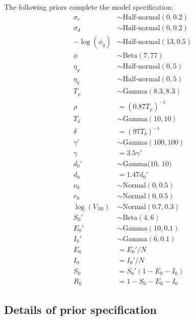 \documentclass[12pt,letterpaper]{article}
\begin{document}
The following priors complete the model specification:
\begin{align}
\sigma_r & \sim \text{Half-normal}(0, 0.2)\\
\sigma_d & \sim \text{Half-normal}(0, 0.2)\\
-\log(\phi_q) & \sim \text{Half-normal}(13, 0.5)\\
\phi & \sim \text{Beta}(7, 77)\\
\eta_y &\sim \text{Half-normal}(0, 5)\\
\eta_q & \sim \text{Half-normal}(0, 5)\\
T_{\rho} & \sim \text{Gamma}(8.3, 8.3)\\
\rho & = (0.87 T_{\rho})^{-1}\\
T_{\delta} & \sim \text{Gamma}(10, 10)\\
\delta & = (97 T_{\delta})^{-1}\\
\gamma' & \sim \text{Gamma}(100, 100)\\
\gamma & = 3.5\gamma'\\
d_0' & \sim \text{Gamma(10, 10)}\\
d_0 & = 1.47 d_0'\\
\nu_0 & \sim \text{Normal}(0, 0.5)\\
r_0 & \sim \text{Normal}(0, 0.5)\\
\log(V_{N0}) & \sim \text{Normal}(0.7, 0.3) \\ 
S_0' & \sim \text{Beta}(4, 6)\\
E_0' & \sim \text{Gamma}(10, 0.1)\\
I_0' & \sim \text{Gamma}(6, 0.1)\\
E_0 & = E_0' / N \\
I_0 & = I_0' / N \\ 
S_0 & = S_0'(1 - E_0 - I_0) \\
R_0 & = 1 - S_0 - E_0 - I_0
\end{align}

\subsection*{Details of prior specification}
\end{document}

